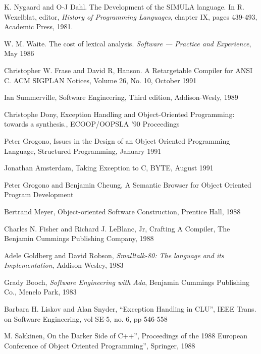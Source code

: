 
\begin{thebibliography}{Summnerville89}

K. Nygaard and O-J Dahl.  The Development
of the SIMULA language. In R. Wexelblat, editor, {\em History of
Programming Languages}, chapter IX, pages 439-493, Academic Press,
1981.

W. M. Waite. The cost of lexical analysis. {\em
Software --- Practice and Experience}, May 1986

Christopher W. Frase and David R, Hanson. A
Retargetable Compiler for ANSI C.  ACM SIGPLAN Notices, Volume 26, No.
10, October 1991

Ian Summerville, Software
Engineering, Third edition, Addison-Wesly, 1989

Christophe Dony, Exception Handling and
Object-Oriented Programming: towards a synthesis., ECOOP/OOPSLA '90
Proceedings

Peter Grogono, Issues in the Design of an Object
Oriented Programming Language, Structured Programming, January 1991

Jonathan Amsterdam, Taking Exception 
to C, BYTE, August 1991

Peter Grogono and Benjamin Cheung, A Semantic Browser
for Object Oriented Program Development

Bertrand Meyer, Object-oriented Software
Construction, Prentice Hall, 1988

Charles N. Fisher and Richard J. LeBlanc,
Jr, Crafting A Compiler, The Benjamin Cummings Publishing Company,
1988

Adele Goldberg and David Robson,
{\em Smalltalk-80: The language and its Implementation}, Addison-Wesley,
1983

Grady Booch, {\em Software Engineering with
Ada}, Benjamin Cummings Publishing Co., Menelo Park, 1983

Barbara H. Liskov and Alan Snyder,
``Exception Handling in CLU'', IEEE Trans. on Software Engineering,
vol SE-5, no. 6, pp 546-558

M. Sakkinen, On the Darker Side of C++'', 
Proceedings of the 1988 European Conference of Object Oriented Programming'',
Springer, 1988

\end{thebibliography}
